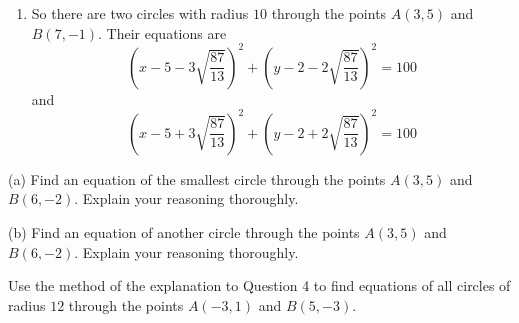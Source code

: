 \documentclass{ximera}
\begin{document}
\begin{question}
\begin{explanation}
\begin{enumerate}
\item So there are two circles with radius $10$ through the points $A(3,5)$ and $B(7,-1)$. Their equations are
\[
     \left( x - 5 - 3 \sqrt{\frac{87}{13}}  \right)^2  +  \left( y - 2 - 2\sqrt{\frac{87}{13}} \right)^2   = 100
\] 
and
\[
   \left( x - 5 + 3 \sqrt{\frac{87}{13}}  \right)^2  +  \left( y - 2 + 2\sqrt{\frac{87}{13}} \right)^2   = 100
\]
\end{enumerate}

\end{explanation}
\end{question}


\begin{question} \label{Q1444sfdsf4433}
(a) Find an equation of the smallest circle through the points $A(3,5)$ and $B(6,-2)$. Explain your reasoning thoroughly.

(b) Find an equation of another circle through the points $A(3,5)$ and $B(6,-2)$. Explain your reasoning thoroughly.

\end{question}

\begin{question} \label{Qdfr3r34f}
Use the method of the explanation to Question 4 to find equations of all circles of radius $12$ through the points $A(-3,1)$ and $B(5,-3)$.
\end{question}
\end{document}
